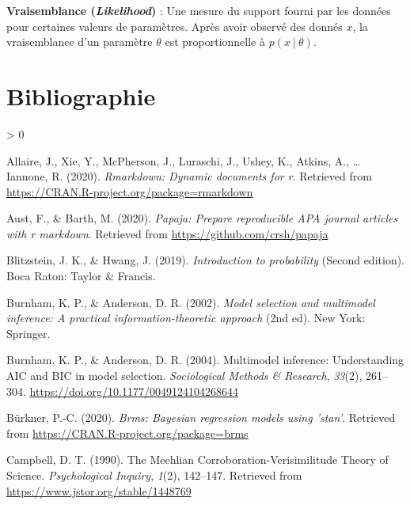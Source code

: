 \documentclass[
  a4paper,11pt,twoside,onecolumn,openright,final,oldfontcommands]{memoir}
\newlength{\cslhangindent}
\newenvironment{CSLReferences}[2] %
 {%
  \setlength{\parindent}{0pt}
  \ifodd #1 \everypar{\setlength{\hangindent}{\cslhangindent}}\ignorespaces\fi
  \ifnum #2 > 0
  \setlength{\parskip}{#2\baselineskip}
  \fi
 }%
 {}
\theoremstyle{definition}
\theoremstyle{definition}
\theoremstyle{definition}
\theoremstyle{remark}
\begin{document}
\textbf{Vraisemblance (\emph{Likelihood})} : Une mesure du support fourni par les données pour certaines valeurs de paramètres. Après avoir observé des donnés \(x\), la vraisemblance d'un paramètre \(\theta\) est proportionnelle à \(p(x \ | \ \theta)\).

\hypertarget{bibliographie}{%
\chapter*{Bibliographie}\label{bibliographie}}


\setlength{\parindent}{-0.5in}
\setlength{\parskip}{8pt}

\hypertarget{refs}{}
\begin{CSLReferences}{1}{0}
\leavevmode\hypertarget{ref-R-rmarkdown}{}%
Allaire, J., Xie, Y., McPherson, J., Luraschi, J., Ushey, K., Atkins, A., \ldots{} Iannone, R. (2020). \emph{Rmarkdown: Dynamic documents for r}. Retrieved from \url{https://CRAN.R-project.org/package=rmarkdown}

\leavevmode\hypertarget{ref-R-papaja}{}%
Aust, F., \& Barth, M. (2020). \emph{Papaja: Prepare reproducible APA journal articles with r markdown}. Retrieved from \url{https://github.com/crsh/papaja}

\leavevmode\hypertarget{ref-blitzstein_introduction_2019}{}%
Blitzstein, J. K., \& Hwang, J. (2019). \emph{Introduction to probability} (Second edition). Boca Raton: Taylor \& Francis.

\leavevmode\hypertarget{ref-burnham_model_2002}{}%
Burnham, K. P., \& Anderson, D. R. (2002). \emph{Model selection and multimodel inference: A practical information-theoretic approach} (2nd ed). New York: Springer.

\leavevmode\hypertarget{ref-burnham_multimodel_2004}{}%
Burnham, K. P., \& Anderson, D. R. (2004). Multimodel inference: {Understanding} {AIC} and {BIC} in model selection. \emph{Sociological Methods \& Research}, \emph{33}(2), 261--304. \url{https://doi.org/10.1177/0049124104268644}

\leavevmode\hypertarget{ref-R-brms}{}%
Bürkner, P.-C. (2020). \emph{Brms: Bayesian regression models using 'stan'}. Retrieved from \url{https://CRAN.R-project.org/package=brms}

\leavevmode\hypertarget{ref-campbell_meehlian_1990}{}%
Campbell, D. T. (1990). The {Meehlian} {Corroboration}-{Verisimilitude} {Theory} of {Science}. \emph{Psychological Inquiry}, \emph{1}(2), 142--147. Retrieved from \url{https://www.jstor.org/stable/1448769}


\end{CSLReferences}
\end{document}
